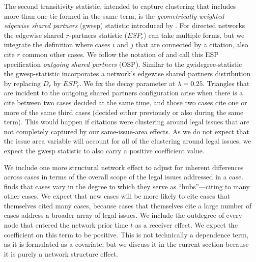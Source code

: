 \documentclass{cup-pan}
\begin{document}
The second transitivity statistic, intended to capture clustering that includes more than one tie formed in the same term, is the \textit{geometrically weighted edgewise shared partners} (gwesp) statistic introduced by \citet{hunter2006inference}. For directed networks the edgewise shared $r$-partners statistic ($ESP_r$) can take multiple forms, but we integrate the definition where cases $i$ and $j$ that are connected by a citation, also cite $r$ common other cases. We follow the notation of \citet{Butts.2008} and call this ESP specification \textit{outgoing shared partners} (OSP). Similar to the gwidegree-statistic the gwesp-statistic incorporates a network's edgewise shared partners distribution by replacing $D_r$ by $ESP_r$. We fix the decay parameter at $\lambda=0.25$. Triangles that are incident to the outgoing shared partners configuration arise when there is a cite between two cases decided at the same time, and those two cases cite one or more of the same third cases (decided either previously or also during the same term). This would happen if citations were clustering around legal issues that are not completely captured by our same-issue-area effects.  As we do not expect that the issue area variable will account for all of the clustering around legal issues, we expect the gwesp statistic to also carry a positive coefficient value.

We include one more structural network effect to adjust for inherent differences across cases in terms of the overall scope of the legal issues addressed in a case.  \citet{fowler2008authority} finds that cases vary in the degree to which they serve as ``hubs''---citing to many other cases. We expect that new cases will be more likely to cite cases that themselves cited many cases, because cases that themselves cite a large number of cases address a broader array of legal issues. We include the outdegree of every node that entered the network prior time $t$ as a receiver effect. We expect the coefficient on this term to be positive. This is not technically a dependence term, as it is formulated as a covariate, but we discuss it in the current section because it is purely a network structure effect.




\end{document}
